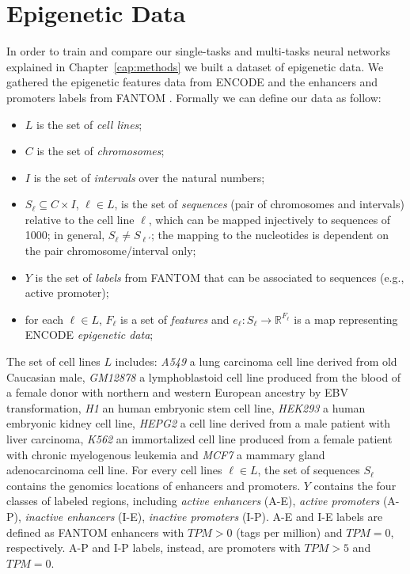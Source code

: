 \section{Epigenetic Data} \label{sec:epigenomic_data}
In order to train and compare our single-tasks and multi-tasks neural networks explained in Chapter~\ref{cap:methods} we built a dataset of epigenetic data. We gathered the epigenetic features data from
ENCODE \cite{ENCODE_data} and the enhancers and promoters labels from
FANTOM \cite{FANTOM_data}. Formally we can define our data as follow: 
\begin{itemize}
    \item $L$ is the set of \emph{cell lines};
    \item $C$ is the set of \emph{chromosomes};
    \item $I$ is the set of \emph{intervals} over the natural numbers;
    \item $S_\ell\subseteq C\times I$, $\ell\in L$, is the set of \emph{sequences} (pair of chromosomes and intervals) relative to the cell line $\ell$, which can be mapped injectively to sequences of 1000; in general, $S_\ell\neq S_{\ell'}$; the mapping to the nucleotides is dependent on the pair chromosome/interval only;
    \item $Y$ is the set of \emph{labels} from FANTOM that can be associated to sequences (e.g., active promoter);
    \item for each $\ell\in L$, $F_\ell$ is a set of \emph{features} and $e_\ell:S_\ell\to\mathbb R^{F_\ell}$ is a map representing ENCODE \emph{epigenetic data};
\end{itemize}
The set of cell lines $L$ includes: \emph{A549} a lung carcinoma cell line derived from old Caucasian male, \emph{GM12878} a lymphoblastoid cell line produced from the blood of a female donor with northern and western European ancestry by EBV transformation, \emph{H1} an human embryonic stem cell line, \emph{HEK293} a human embryonic kidney cell line, \emph{HEPG2} a cell line derived from a male patient with liver carcinoma, \emph{K562} an immortalized cell line produced from a female patient with chronic myelogenous leukemia and \emph{MCF7} a mammary gland adenocarcinoma cell line. For every cell lines $\ell \in L$, the set of sequences $S_\ell$ contains the genomics locations of enhancers and promoters. $Y$ contains the four classes of labeled regions, including \emph{active enhancers} (A-E), \emph{active promoters} (A-P), \emph{inactive enhancers} (I-E), \emph{inactive promoters} (I-P). A-E and I-E labels are defined as FANTOM enhancers with $TPM>0$ (tags per million) and $TPM=0$, respectively. A-P and I-P labels, instead, are promoters with $TPM>5$ and $TPM=0$. 

